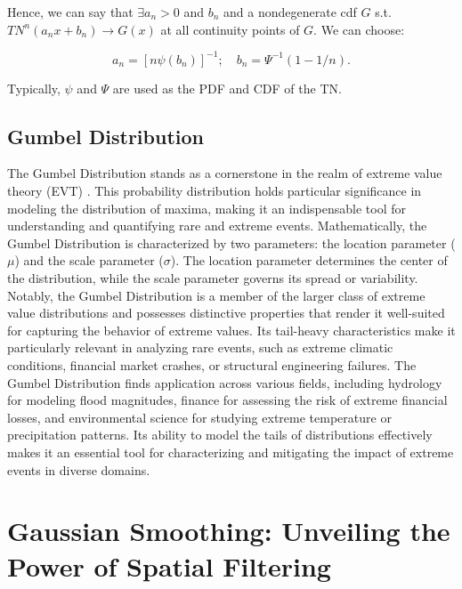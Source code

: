 Hence, we can say that $\exists a_n>0$ and $b_n$ and a nondegenerate cdf $G$ s.t. $TN^n(a_nx+b_n) \rightarrow G(x)$ at all continuity points of $G$. We can choose:

\begin{equation}
a_n = \left[ n\psi(b_n) \right]^{-1}; \quad b_n = \Psi^{-1}(1-1/n).
\label{eq:an_bn}
\end{equation}

Typically, $\psi$ and $\Psi$ are used as the PDF and CDF of the TN.

\subsection{Gumbel Distribution}

The Gumbel Distribution stands as a cornerstone in the realm of extreme value theory (EVT) \cite{nadarajah2004beta}. This probability distribution holds particular significance in modeling the distribution of maxima, making it an indispensable tool for understanding and quantifying rare and extreme events. Mathematically, the Gumbel Distribution is characterized by two parameters: the location parameter ($\mu$) and the scale parameter ($\sigma$). The location parameter determines the center of the distribution, while the scale parameter governs its spread or variability. Notably, the Gumbel Distribution is a member of the larger class of extreme value distributions and possesses distinctive properties that render it well-suited for capturing the behavior of extreme values. Its tail-heavy characteristics make it particularly relevant in analyzing rare events, such as extreme climatic conditions, financial market crashes, or structural engineering failures. The Gumbel Distribution finds application across various fields, including hydrology for modeling flood magnitudes, finance for assessing the risk of extreme financial losses, and environmental science for studying extreme temperature or precipitation patterns. Its ability to model the tails of distributions effectively makes it an essential tool for characterizing and mitigating the impact of extreme events in diverse domains.

\section{Gaussian Smoothing: Unveiling the Power of Spatial Filtering}

